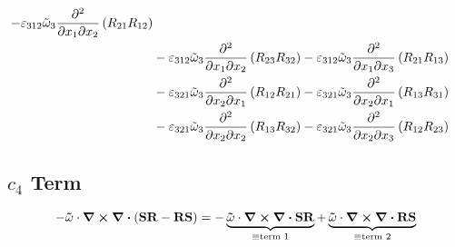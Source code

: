 \begin{equation}
{\begin{split}
            -{\varepsilon_{312}\tilde{\omega}_{3}\pdv{}{x_{1}}{x_{2}}\left(R_{21}R_{12}\right)}\\
            &-{\varepsilon_{312}\tilde{\omega}_{3}\pdv{}{x_{1}}{x_{2}}\left(R_{23}R_{32}\right)}
            -{\varepsilon_{312}\tilde{\omega}_{3}\pdv{}{x_{1}}{x_{3}}\left(R_{21}R_{13}\right)}\\
            &-{\varepsilon_{321}\tilde{\omega}_{3}\pdv{}{x_{2}}{x_{1}}\left(R_{12}R_{21}\right)}
            -{\varepsilon_{321}\tilde{\omega}_{3}\pdv{}{x_{2}}{x_{1}}\left(R_{13}R_{31}\right)}\\
            &-{\varepsilon_{321}\tilde{\omega}_{3}\pdv{}{x_{2}}{x_{2}}\left(R_{13}R_{32}\right)}
            -{\varepsilon_{321}\tilde{\omega}_{3}\pdv{}{x_{2}}{x_{3}}\left(R_{12}R_{23}\right)}
        \end{split}
            }
\end{equation}

\newpage
\subsection{$c_{4}$ Term}
\begin{equation}
    -\mathbf{\tilde{\omega}}\cdot\curl \div \left(\mathbf{SR}-\mathbf{RS}\right)=
        -\underbrace{\mathbf{\tilde{\omega}}\cdot\curl \div \mathbf{SR}}_{\equiv \text{term 1}}
        +\underbrace{\mathbf{\tilde{\omega}}\cdot\curl \div \mathbf{RS}}_{\equiv \text{term 2}} 
\end{equation}
